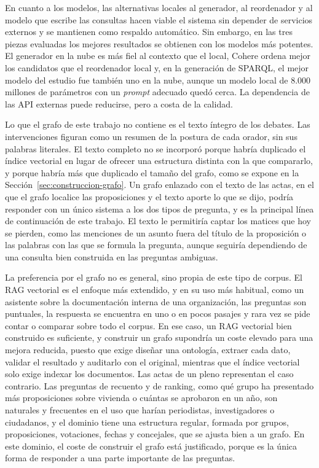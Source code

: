\documentclass[11pt, a4paper]{report}
\begin{document}
	En cuanto a los modelos, las alternativas locales al generador, al
	reordenador y al modelo que escribe las consultas hacen viable el sistema sin
	depender de servicios externos y se mantienen como respaldo automático. Sin
	embargo, en las tres piezas evaluadas los mejores resultados se obtienen con
	los modelos más potentes. El generador en la nube es más fiel al contexto que
	el local, Cohere ordena mejor los candidatos que el reordenador local y, en la
	generación de SPARQL, el mejor modelo del estudio fue también uno en la nube,
	aunque un modelo local de 8.000 millones de parámetros con un \textit{prompt}
	adecuado quedó cerca. La dependencia de las API externas puede reducirse, pero
	a costa de la calidad.

	Lo que el grafo de este trabajo no contiene es el texto íntegro de los
	debates. Las intervenciones figuran como un resumen de la postura de cada orador, sin sus palabras literales. El texto completo no se incorporó porque
	habría duplicado el índice vectorial en lugar de ofrecer una estructura
	distinta con la que compararlo, y porque habría más que duplicado el tamaño
	del grafo, como se expone en la Sección~\ref{sec:construccion-grafo}. Un grafo enlazado con el texto de
	las actas, en el que el grafo localice las proposiciones y el texto aporte lo
	que se dijo, podría responder con un único sistema a los dos tipos de
	pregunta, y es la principal línea de continuación de este trabajo. El texto le
	permitiría captar los matices que hoy se pierden, como las menciones de un
	asunto fuera del título de la proposición o las palabras con las que se
	formula la pregunta, aunque seguiría dependiendo de una consulta bien
	construida en las preguntas ambiguas.

	La preferencia por el grafo no es general, sino propia de este tipo de corpus.
	El RAG vectorial es el enfoque más extendido, y en su uso más habitual, como
	un asistente sobre la documentación interna de una organización, las preguntas
	son puntuales, la respuesta se encuentra en uno o en pocos pasajes y rara vez
	se pide contar o comparar sobre todo el corpus. En ese caso, un RAG vectorial
	bien construido es suficiente, y construir un grafo supondría un coste elevado
	para una mejora reducida, puesto que exige diseñar una ontología, extraer cada
	dato, validar el resultado y auditarlo con el original, mientras que el índice
	vectorial solo exige indexar los documentos. Las actas de un pleno representan
	el caso contrario. Las preguntas de recuento y de ranking, como qué grupo ha
	presentado más proposiciones sobre vivienda o cuántas se aprobaron en un año,
	son naturales y frecuentes en el uso que harían periodistas, investigadores o
	ciudadanos, y el dominio tiene una estructura regular, formada por grupos,
	proposiciones, votaciones, fechas y concejales, que se ajusta bien a un grafo.
	En este dominio, el coste de construir el grafo está justificado, porque es la
	única forma de responder a una parte importante de las preguntas.
\end{document}
